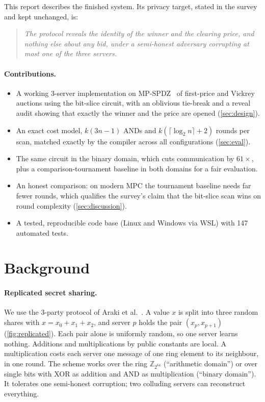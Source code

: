 \documentclass[11pt,a4paper]{article}
\newcommand{\Z}{\mathbb{Z}}
\begin{document}
This report describes the finished system. Its privacy target, stated in the survey and kept
unchanged, is:

\begin{quote}
\emph{The protocol reveals the identity of the winner and the clearing price, and nothing else
about any bid, under a semi-honest adversary corrupting at most one of the three servers.}
\end{quote}

\paragraph{Contributions.}
\begin{itemize}
  \item A working 3-server implementation on MP-SPDZ~\cite{mpspdz} of first-price and Vickrey
        auctions using the bit-slice circuit, with an oblivious tie-break and a reveal audit showing
        that exactly the winner and the price are opened (\cref{sec:design}).
  \item An exact cost model, $k(3n-1)$ ANDs and $k(\lceil\log_2 n\rceil+2)$ rounds per scan,
        matched exactly by the compiler across all configurations (\cref{sec:eval}).
  \item The same circuit in the binary domain, which cuts communication by $61\times$, plus a
        comparison-tournament baseline in both domains for a fair evaluation.
  \item An honest comparison: on modern MPC the tournament baseline needs far fewer rounds, which
        qualifies the survey's claim that the bit-slice scan wins on round complexity
        (\cref{sec:discussion}).
  \item A tested, reproducible code base (Linux and Windows via WSL) with 147 automated tests.
\end{itemize}

\section{Background}
\label{sec:background}

\paragraph{Replicated secret sharing.}
We use the 3-party protocol of Araki et al.~\cite{araki16}. A value $x$ is split into three
random shares with $x = x_0 + x_1 + x_2$, and server $p$ holds the pair $(x_p, x_{p+1})$
(\cref{fig:replicated}). Each pair alone is uniformly random, so one server learns nothing.
Additions and multiplications by public constants are local. A multiplication costs each server
one message of one ring element to its neighbour, in one round. The scheme works over the ring
$\Z_{2^{64}}$ (``arithmetic domain'') or over single bits with XOR as addition and AND as
multiplication (``binary domain''). It tolerates one semi-honest corruption; two colluding
servers can reconstruct everything.
\end{document}
